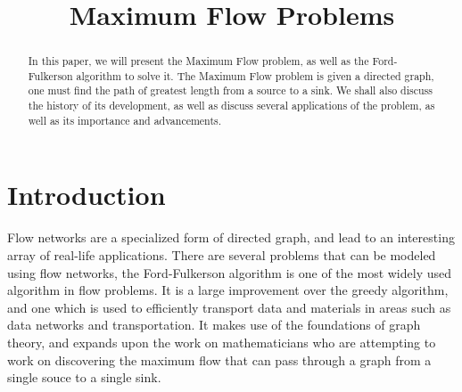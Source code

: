 \documentclass[conference]{IEEEtran}
\begin{document}
%
\title{Maximum Flow Problems}


\author{
}

\maketitle

\begin{abstract}
In this paper, we will present the Maximum Flow problem, as well as the Ford-Fulkerson algorithm to solve it. The Maximum Flow problem is given a directed graph, one must find the path of greatest length from a source to a sink. We shall also discuss the history of its development, as well as discuss several applications of the problem, as well as its importance and advancements.
\end{abstract}





%
\IEEEpeerreviewmaketitle



\section{Introduction}
Flow networks are a specialized form of directed graph, and lead to an interesting array of real-life applications. There are several problems that can be modeled using flow networks, the Ford-Fulkerson algorithm is one of the most widely used algorithm in flow problems. It is a large improvement over the greedy algorithm, and one which is used to efficiently transport data and materials in areas such as data networks and transportation. It makes use of the foundations of graph theory, and expands upon the work on mathematicians who are attempting to work on discovering the maximum flow that can pass through a graph from a single souce to a single sink.
\end{document}

